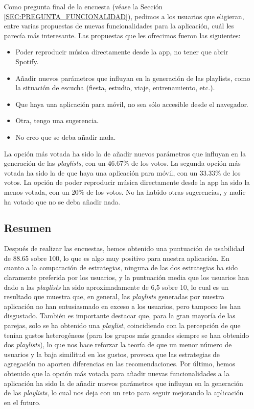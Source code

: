 Como pregunta final de la encuesta (véase la Sección \ref{SEC:PREGUNTA_FUNCIONALIDAD}), pedimos a los usuarios que eligieran, entre varias propuestas de nuevas funcionalidades para la 
aplicación, cuál les parecía más interesante. Las propuestas que les ofrecimos fueron las siguientes:

\begin{itemize}
    \item Poder reproducir música directamente desde la app, no tener que abrir Spotify.
    \item Añadir nuevos parámetros que influyan en la generación de las playlists, como la situación de escucha (fiesta, estudio, viaje, entrenamiento, etc.).
    \item Que haya una aplicación para móvil, no sea sólo accesible desde el navegador.
    \item Otra, tengo una sugerencia.
    \item No creo que se deba añadir nada.
\end{itemize}

La opción más votada ha sido la de añadir nuevos parámetros que influyan en la generación de las \textit{playlists}, con un 46.67\% de los votos.
La segunda opción más votada ha sido la de que haya una aplicación para móvil, con un 33.33\% de los votos. 
La opción de poder reproducir música directamente desde la app ha sido la menos votada, con un 20\% de los votos.
No ha habido otras sugerencias, y nadie ha votado que no se deba añadir nada.

\subsection{Resumen\label{SEC:RESUMEN_ENCUESTA}}

Después de realizar las encuestas, hemos obtenido una puntuación de usabilidad de 88.65 sobre 100, lo que es algo muy positivo para nuestra aplicación.
En cuanto a la comparación de estrategias, ninguna de las dos estrategias ha sido claramente preferida por los usuarios, y la puntuación media 
que los usuarios han dado a las \textit{playlists} ha sido aproximadamente de 6,5 sobre 10, lo cual es un resultado que muestra que, 
en general, las \textit{playlists} generadas por nuestra aplicación no han entusiasmado en exceso a los usuarios, pero tampoco les han disgustado.
También es importante destacar que, para la gran mayoría de las parejas, solo se ha obtenido una \textit{playlist}, coincidiendo con la percepción
de que tenían gustos heterogéneos (para los grupos más grandes siempre se han obtenido dos \textit{playlists}), lo que nos hace reforzar la teoría 
de que un menor número de usuarios y la baja similitud en los gustos, provoca que las estrategias de agregación no aporten diferencias en las recomendaciones.
Por último, hemos obtenido que la opción más votada para añadir nuevas funcionalidades a la aplicación ha sido la de añadir nuevos parámetros que influyan 
en la generación de las \textit{playlists}, lo cual nos deja con un reto para seguir mejorando la aplicación en el futuro.